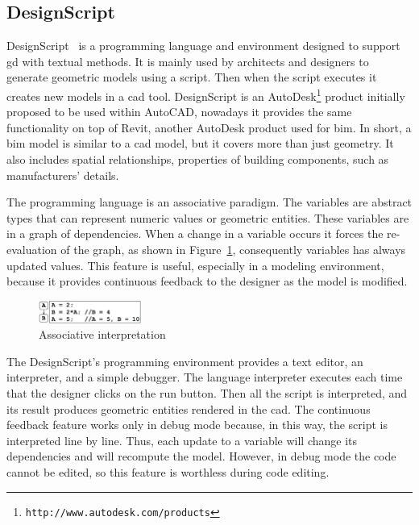 \subsection{DesignScript}
\label{subsec:designscript}
DesignScript~\cite{aish2012designscript} is a programming language and environment designed to support \gls{gd} with textual methods. It is mainly used by architects and designers to generate geometric models using a script. Then when the script executes it creates new models in a \gls{cad} tool. DesignScript is an AutoDesk\footnote{\texttt{http://www.autodesk.com/products}} product initially proposed to be used within AutoCAD, nowadays it provides the same functionality on top of Revit, another AutoDesk product used for \gls{bim}. In short, a \gls{bim} model is similar to a \gls{cad} model, but it covers more than just geometry. It also includes spatial relationships, properties of building components, such as manufacturers' details.

The programming language is an associative paradigm. The variables are abstract types that can represent numeric values or geometric entities. These variables are in a graph of dependencies. When a change in a variable occurs it forces the re-evaluation of the graph, as shown in Figure~\ref{fig:designscript}, consequently variables has always updated values. This feature is useful, especially in a modeling environment, because it provides continuous feedback to the designer as the model is modified.

\begin{figure}[!h]
  \centering
    \includegraphics[width=0.3\textwidth]{images/designscript}
 \caption{Associative interpretation}  
    \label{fig:designscript}
\end{figure}

The DesignScript's programming environment provides a text editor, an interpreter, and a simple debugger. The language interpreter executes each time that the designer clicks on the run button. Then all the script is interpreted, and its result produces geometric entities rendered in the \gls{cad}. The continuous feedback feature works only in debug mode because, in this way, the script is interpreted line by line. Thus, each update to a variable will change its dependencies and will recompute the model. However, in debug mode the code cannot be edited, so this feature is worthless during code editing.

